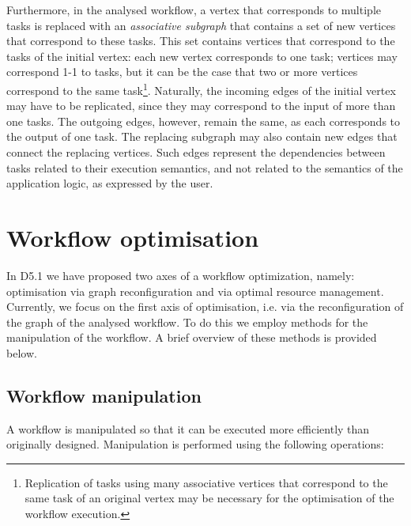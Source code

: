 \documentclass[12pt,openany,onecolumn]{book}
\begin{document}
Furthermore, in the analysed workflow, a vertex that corresponds to multiple tasks is replaced with an \emph{associative subgraph} that contains a set of new vertices that correspond to these tasks. This set contains vertices that correspond to the tasks of the initial vertex: each new vertex corresponds to one task; vertices may correspond 1-1 to tasks, but it can be the case that two or more vertices correspond to the same task\footnote{Replication of tasks using many associative vertices that correspond to the same task of an original vertex may be necessary for the optimisation of the workflow execution.}. Naturally, the incoming edges of the initial vertex may have to be replicated, since they may correspond to the input of more than one tasks. The outgoing edges, however, remain the same, as each corresponds to the output of one task. The replacing subgraph may also contain new edges that connect the replacing vertices. Such edges represent the dependencies between tasks related to their execution semantics, and not related to the semantics of the application logic, as expressed by the user.

\section{Workflow optimisation}\label{sec:optimisation}
In D5.1 \cite{d5.1} we have proposed two axes of a workflow optimization, namely: optimisation via graph reconfiguration and via optimal resource management. Currently, we focus on the first axis of optimisation, i.e. via the reconfiguration of the graph of the analysed workflow. To do this we employ methods for the manipulation of the workflow. A brief overview of these methods is provided below.

\subsection{Workflow manipulation}\label{subsec:transitions}
A workflow is manipulated so that it can be executed more efficiently than originally designed. Manipulation is performed using the following operations:
\end{document}
